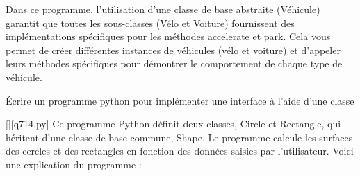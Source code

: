 \begin{solution}
Dans ce programme, l'utilisation d'une classe de base abstraite (Véhicule) garantit que toutes les sous-classes (Vélo et Voiture) fournissent des implémentations spécifiques pour les méthodes accelerate et park. Cela vous permet de créer différentes instances de véhicules (vélo et voiture) et d'appeler leurs méthodes spécifiques pour démontrer le comportement de chaque type de véhicule.
        \end{solution}
        

        \question
        Écrire un programme python pour implémenter une interface à l'aide d'une classe
        \par
        \begin{solution}
            \renewcommand{\nomfichier}{q714.py}
            \pythonfile{\chemincode \nomfichier}[][\nomfichier]
            Ce programme Python définit deux classes, Circle et Rectangle, qui héritent d'une classe de base commune, Shape. Le programme calcule les surfaces des cercles et des rectangles en fonction des données saisies par l'utilisateur. Voici une explication du programme :


\end{solution}
